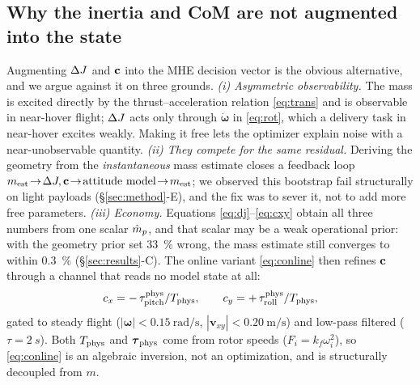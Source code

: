 \documentclass[conference]{IEEEtran}
\begin{document}
\subsection{Why the inertia and CoM are not augmented into the state}
\label{sec:whynotaugment}
Augmenting $\Delta J$ and $\mathbf{c}$ into the MHE decision vector is the obvious alternative, and we
argue against it on three grounds. \emph{(i) Asymmetric observability.} The mass is excited
directly by the thrust--acceleration relation \eqref{eq:trans} and is observable in near-hover
flight; $\Delta J$ acts only through $\dot{\boldsymbol{\omega}}$ in \eqref{eq:rot}, which a delivery
task in near-hover excites weakly. Making it free lets the optimizer explain noise with a
near-unobservable quantity. \emph{(ii) They compete for the same residual.} Deriving the
geometry from the \emph{instantaneous} mass estimate closes a feedback loop
$m_{\mathrm{est}} \!\rightarrow\! \Delta J,\mathbf{c} \!\rightarrow\! \text{attitude model} \!\rightarrow\! m_{\mathrm{est}}$;
we observed this bootstrap fail structurally on light payloads (\S\ref{sec:method}-E), and the
fix was to sever it, not to add more free parameters. \emph{(iii) Economy.} Equations
\eqref{eq:dj}--\eqref{eq:cxy} obtain all three numbers from one scalar $\hat{m}_p$, and that scalar
may be a weak operational prior: with the geometry prior set \SI{33}{\percent} wrong, the mass
estimate still converges to within \SI{0.3}{\percent} (\S\ref{sec:results}-C). The online
variant \eqref{eq:conline} then refines $\mathbf{c}$ through a channel that reads no model state at
all:
\begin{equation}
c_x = -\,\tau_{\mathrm{pitch}}^{\mathrm{phys}} / T_{\mathrm{phys}}, \qquad
c_y = +\,\tau_{\mathrm{roll}}^{\mathrm{phys}} / T_{\mathrm{phys}}, \label{eq:conline}
\end{equation}
gated to steady flight ($|\boldsymbol{\omega}| < \SI{0.15}{\radian\per\second}$,
$|\mathbf{v}_{xy}| < \SI{0.20}{\meter\per\second}$) and low-pass filtered
($\tau = \SI{2}{s}$). Both $T_{\mathrm{phys}}$ and $\boldsymbol{\tau}_{\mathrm{phys}}$ come from rotor speeds
($F_i = k_f \omega_i^2$), so \eqref{eq:conline} is an algebraic inversion, not an optimization,
and is structurally decoupled from $m$.
\end{document}
